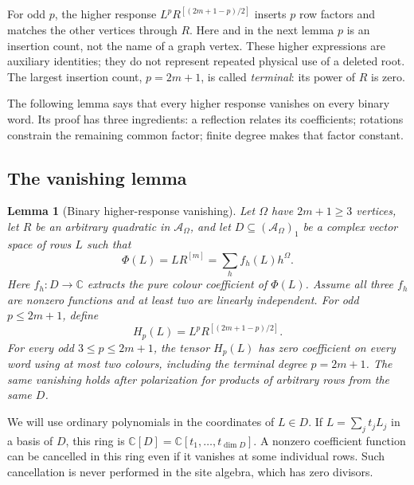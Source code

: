 \documentclass[11pt]{article}
\newtheorem{lemma}[theorem]{Lemma}
\theoremstyle{definition}
\theoremstyle{plain}
\numberwithin{equation}{section}
\begin{document}
For odd \(p\), the higher response \(L^pR^{[(2m+1-p)/2]}\) inserts
\(p\) row factors and matches the other vertices through \(R\).
Here and in the next lemma \(p\) is an insertion count, not the name of
a graph vertex. These higher expressions are auxiliary identities; they
do not represent repeated physical use of a deleted root. The largest
insertion count, \(p=2m+1\), is called \emph{terminal}: its power of
\(R\) is zero.

The following lemma says that every higher response vanishes on every
binary word. Its proof has three ingredients: a reflection relates its
coefficients; rotations constrain the remaining common factor; finite
degree makes that factor constant.

\subsection{The vanishing lemma}
\begin{lemma}[Binary higher-response vanishing]\label{lem:higher}
Let \(\Omega\) have \(2m+1\ge3\) vertices, let \(R\) be an arbitrary quadratic
in \(\mathcal A_\Omega\), and let \(D\subseteq(\mathcal A_\Omega)_1\)
be a complex vector space of rows \(L\) such that
\begin{equation}
 \Phi(L)=L R^{[m]}=\sum_h f_h(L)h^\Omega.
 \tag{2}\label{eq:root}
\end{equation}
Here \(f_h:D\to\mathbb C\) extracts the pure colour coefficient of
\(\Phi(L)\). Assume all three \(f_h\) are nonzero functions and at least
two are linearly independent. For odd \(p\le2m+1\), define
\[
 H_p(L)=L^p R^{[(2m+1-p)/2]}.
\]
For every odd \(3\le p\le2m+1\), the tensor \(H_p(L)\) has zero coefficient on every word
using at most two colours, including the terminal degree \(p=2m+1\).
The same vanishing holds after polarization for products of arbitrary rows
from the same \(D\).
\end{lemma}

We will use ordinary polynomials in the coordinates of \(L\in D\).
If \(L=\sum_j t_jL_j\) in a basis of \(D\), this ring is
\(\mathbb C[D]=\mathbb C[t_1,\ldots,t_{\dim D}]\).
A nonzero coefficient function can be cancelled in this ring even if it
vanishes at some individual rows. Such cancellation is never performed
in the site algebra, which has zero divisors.
\end{document}
